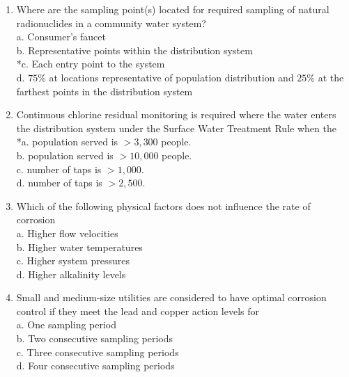 \begin{enumerate}[1.]
\item Where are the sampling point(s) located for required sampling of natural radionuclides in a community water system?\\

a. Consumer's faucet\\
b. Representative points within the distribution system\\
*c. Each entry point to the system\\
d. $75 \%$ at locations representative of population distribution and $25 \%$ at the farthest points in the distribution system\\

  \item Continuous chlorine residual monitoring is required where the water enters the distribution system under the Surface Water Treatment Rule when the\\
*a. population served is $>3,300$ people.\\
b. population served is $>10,000$ people.\\
c. number of taps is $>1,000$.\\
d. number of taps is $>2,500$.\\

\item Which of the following physical factors does not influence the rate of corrosion\\
a.	Higher flow velocities\\
b.	Higher water temperatures\\
c.	Higher system pressures\\
d.	Higher alkalinity levels\\

\item Small and medium-size utilities are considered to have optimal corrosion control if they meet the lead and copper action levels for\\
a.	One sampling period\\
b.	Two consecutive sampling periods\\
c.	Three consecutive sampling periods\\
d.	Four consecutive sampling periods\\

\end{enumerate}
